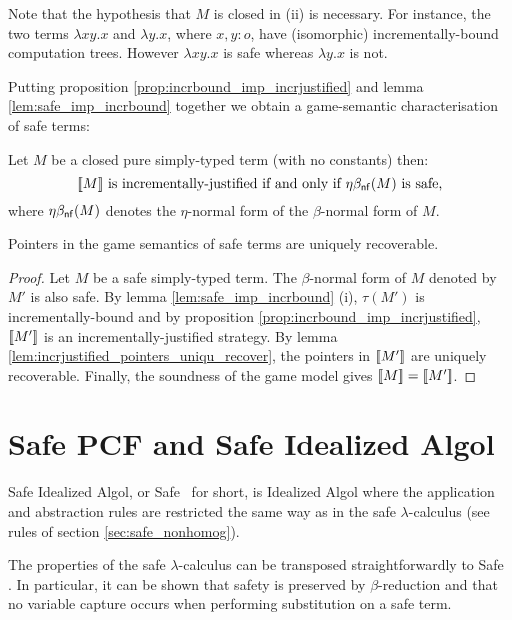 Note that the hypothesis that $M$ is closed in (ii) is necessary.
For instance, the two terms $\lambda x y .x$ and $\lambda y . x$,
where $x,y:o$, have (isomorphic) incrementally-bound computation
trees. However $\lambda x y .x$ is safe whereas $\lambda y . x$ is
not.



Putting proposition \ref{prop:incrbound_imp_incrjustified} and lemma
\ref{lem:safe_imp_incrbound} together we obtain a game-semantic
characterisation of safe terms:
\begin{cor}
Let $M$ be a closed pure simply-typed term (with no constants) then:
$$ {[\![ M ]\!]} \mbox{ is incrementally-justified if and only if $\eta\beta_{\sf nf}(M)$ is safe,} $$
where $\eta\beta_{\sf nf}(M)$ denotes the $\eta$-normal form of the
$\beta$-normal form of $M$.
\end{cor}



\begin{thm}
\label{thm:safe_ptr_recoverable} Pointers in the game semantics of
safe terms are uniquely recoverable.
\end{thm}
\begin{proof}
Let $M$ be a safe simply-typed term. The $\beta$-normal form of $M$
denoted by $M'$ is also safe. By lemma \ref{lem:safe_imp_incrbound}
(i), $\tau(M')$ is incrementally-bound and by proposition
\ref{prop:incrbound_imp_incrjustified}, ${[\![ M' ]\!]}$ is an
incrementally-justified strategy. By lemma
\ref{lem:incrjustified_pointers_uniqu_recover}, the pointers in
${[\![ M' ]\!]}$ are uniquely recoverable. Finally, the soundness of the
game model gives ${[\![ M ]\!]} = {[\![ M' ]\!]}$.
\end{proof}


\section{Safe PCF and Safe Idealized Algol}

Safe Idealized Algol, or Safe \ialgol\ for short, is Idealized Algol
where the application and abstraction rules are restricted the same
way as in the safe $\lambda$-calculus (see rules of section
\ref{sec:safe_nonhomog}).

The properties of the safe $\lambda$-calculus can be transposed
straightforwardly to Safe \ialgol. In particular, it can be shown
that safety is preserved by $\beta$-reduction and that no variable
capture occurs when performing substitution on a safe term.

